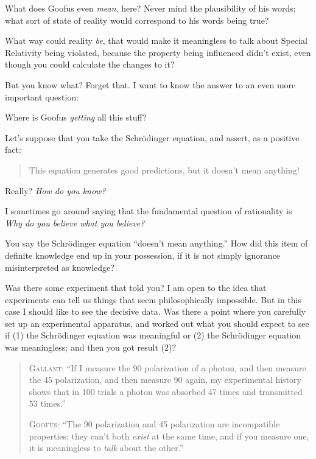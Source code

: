 {
 What does Goofus even \textit{mean}, here? Never mind the
plausibility of his words; what sort of state of reality would
correspond to his words being true?}

{
 What way could reality \textit{be}, that would make it meaningless
to talk about Special Relativity being violated, because the property
being influenced didn't exist, even though you could
calculate the changes to it?}

{
 But you know what? Forget that. I want to know the answer to an
even more important question:}

{
 Where is Goofus \textit{getting} all this stuff?}

{
 Let's suppose that you take the Schrödinger
equation, and assert, as a positive fact:}

\begin{quote}
{
 This equation generates good predictions, but it
 doesn't mean anything!}
\end{quote}

{
 Really? \textit{How do you know?}}

{
 I sometimes go around saying that the fundamental question of
rationality is \textit{Why do you believe what you believe?}}

{
 You say the Schrödinger equation
``doesn't mean
anything.'' How did this item of definite knowledge
end up in your possession, if it is not simply ignorance misinterpreted
as knowledge?}

{
 Was there some experiment that told you? I am open to the idea
that experiments can tell us things that seem philosophically
impossible. But in this case I should like to see the decisive data.
Was there a point where you carefully set up an experimental apparatus,
and worked out what you should expect to see if (1) the Schrödinger
equation was meaningful or (2) the Schrödinger equation was
meaningless; and then you got result (2)?}

\begin{quotation}
{
 \textsc{Gallant}: ``If I measure the 90\degree{}
polarization of a photon, and then measure the 45\degree{}
polarization, and then measure 90\degree{} again, my
experimental history shows that in 100 trials a photon was absorbed 47
times and transmitted 53 times.''}

{
 \textsc{Goofus}: ``The 90\degree{} polarization
and 45\degree{} polarization are incompatible properties;
they can't both \textit{exist} at the same time, and if
you measure one, it is meaningless to \textit{talk} about the
other.''}
\end{quotation}


